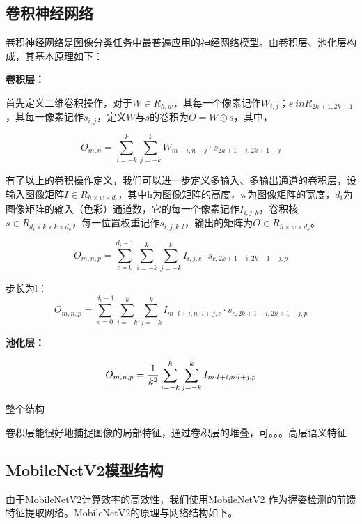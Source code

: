 \subsection{卷积神经网络}
卷积神经网络是图像分类任务中最普遍应用的神经网络模型。由卷积层、池化层构成，其基本原理如下：

\textbf{卷积层：}

首先定义二维卷积操作，对于$W \in R_{h,w}$，其每一个像素记作$W_{i,j}$；$s \ in R_{2k+1,2k+1}$，其每一像素记作$s_{i,j}$，定义$W$与$s$的卷积为$O = W \odot s$，其中，

\begin{equation}
    O_{m,n} = \sum\limits_{i = -k}^k \sum\limits_{j = -k}^k W_{m+i,n+j} \cdot s_{2k+1-i, 2k+1-j}
\end{equation}

有了以上的卷积操作定义，我们可以进一步定义多输入、多输出通道的卷积层，设输入图像矩阵$I \in R_{h \times w \times d_i}$，其中h为图像矩阵的高度，w为图像矩阵的宽度，$d_i$为图像矩阵的输入（色彩）通道数，它的每一个像素记作$I_{i,j,k}$，卷积核$s \in R_{d_i \times k \times k \times d_o}$，每一位置权重记作$s_{i,j,k,l}$，输出的矩阵为$O \in R_{h \times w \times d_o}$。

\begin{equation}
    O_{m,n,p} = \sum\limits_{c = 0}^{d_i - 1} \sum\limits_{i = -k}^k \sum\limits_{j = -k}^k I_{i,j,c} \cdot s_{c, 2k+1-i, 2k+1-j, p}
\end{equation}



步长为l：
\begin{equation}
    O_{m,n,p} = \sum\limits_{c = 0}^{d_i - 1} \sum\limits_{i = -k}^k \sum\limits_{j = -k}^k I_{m \cdot l+i,n \cdot l+j,c} \cdot s_{c, 2k+1-i, 2k+1-j, p}
\end{equation}


\textbf{池化层：}

\begin{equation}
    O_{m,n,p} =  {1 \over k^2} \sum\limits_{i = -k}^k \sum\limits_{j = -k}^k I_{m \cdot l+i,n \cdot l+j,p}
\end{equation}

整个结构

卷积层能很好地捕捉图像的局部特征，通过卷积层的堆叠，可。。。高层语义特征


\subsection{MobileNetV2模型结构}
由于MobileNetV2计算效率的高效性，我们使用MobileNetV2 作为握姿检测的前馈特征提取网络。MobileNetV2的原理与网络结构如下。

